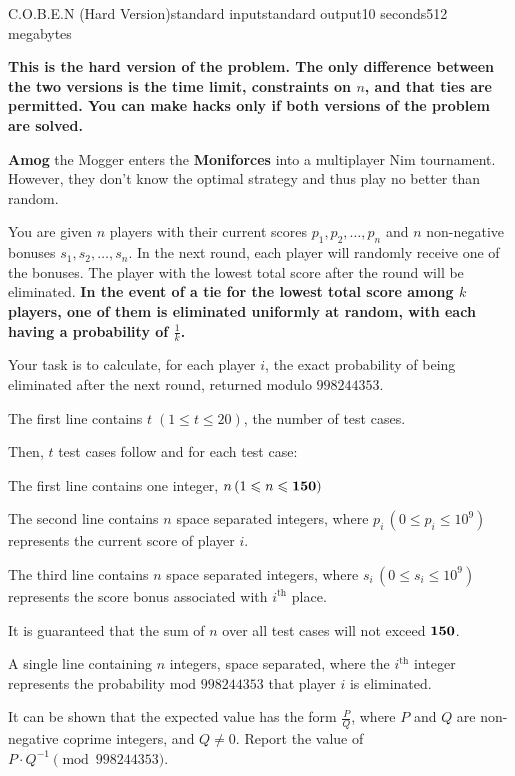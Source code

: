 \begin{problem}{C.O.B.E.N (Hard Version)}{standard input}{standard output}{10 seconds}{512 megabytes}

\textbf{This is the hard version of the problem. The only difference between the two versions is the time limit, constraints on $n$, and that ties are permitted. You can make hacks only if both versions of the problem are solved.}

\textbf{Amog} the Mogger enters the \textbf{Moniforces} into a multiplayer Nim tournament. However, they don't know the optimal strategy and thus play no better than random. 

You are given $n$ players with their current scores $p_1, p_2, \ldots, p_n$ and $n$ non-negative bonuses $s_1, s_2, \ldots, s_n$. In the next round, each player will randomly receive one of the bonuses. The player with the lowest total score after the round will be eliminated. \textbf{In the event of a tie for the lowest total score among $k$ players, one of them is eliminated uniformly at random, with each having a probability of $\frac{1}{k}$.}

Your task is to calculate, for each player $i$, the exact probability of being eliminated after the next round, returned modulo $998244353$.

\InputFile
The first line contains $t \; (1 \leqslant t \leqslant 20)$, the number of test cases.

Then, $t$ test cases follow and for each test case:

The first line contains one integer, $n \, (1 \leqslant n \leqslant \bf{150})$

The second line contains $n$ space separated integers, where $p_i \, (0 \leqslant p_i \leqslant 10^9)$ represents the current score of player $i$.

The third line contains $n$ space separated integers, where $s_i \, (0 \leqslant s_i \leqslant 10^9)$ represents the score bonus associated with $i^{\text{th}}$ place.

It is guaranteed that the sum of $n$ over all test cases will not exceed $\bf{150}$.

\OutputFile
A single line containing $n$ integers, space separated, where the $i^{\text{th}}$ integer represents the probability $\text{mod } 998244353$ that player $i$ is eliminated.

It can be shown that the expected value has the form $\frac{P}{Q}$, where $P$ and $Q$ are non-negative coprime integers, and $Q \neq 0$. Report the value of $P \cdot Q^{-1} \pmod{998244353}$.


\end{problem}
